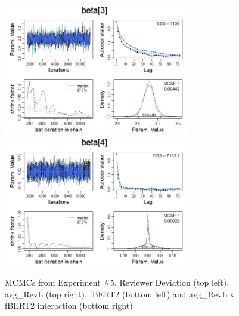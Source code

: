 \documentclass[man, floatsintext, 10pt]{apa6}
\begin{document}
\begin{figure}
\includegraphics[width=8cm]{experiment_5_3.jpg}
\includegraphics[width=8cm]{experiment_5_4.jpg}
\caption{MCMCs from Experiment \#5. Reviewer Deviation (top left), avg\_RevL (top right), fBERT2 (bottom left) and avg\_RevL x fBERT2 interaction (bottom right)}
  \label{Exp5MCMC}
\end{figure}
\end{document}
